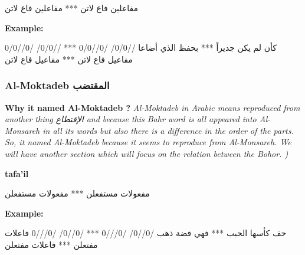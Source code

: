 \begin{Arabic}
  \begin{traditionalpoem*}

مفاعلين فاع لاتن *** مفاعلين فاع لاتن 
    
  \end{traditionalpoem*}
      \end{Arabic}


\textbf{Example:}

\begin{Arabic}
  \begin{traditionalpoem*}


    كأن لم يكن جديراً *** بحفظ الذي أضاعا
    //0/0/  /0//0/0 *** //0/0/  /0//0/0
    مفاعيل  فاع لاتن *** مفاعيل  فاع لاتن
    
          
	\end{traditionalpoem*}
      \end{Arabic}
 \newpage
      

\subsubsection{Al-Moktadeb \textarabic{المقتضب}}
\textbf{Why it named Al-Moktadeb ?}
\textit{Al-Moktadeb in Arabic means reproduced from another thing \textarabic{الإقتطاع} and because this Bahr word is all appeared into Al-Monsareh in all its words but also there is a difference in the order of the parts. So, it named Al-Moktadeb because it seems to reproduce from Al-Monsareh. We will have another section which will focus on the relation between the Bohor. ) %
}

\textbf{tafa'il}

\begin{Arabic}
  \begin{traditionalpoem*}

مفعولات مستفعلن *** مفعولات مستفعلن 
    
  \end{traditionalpoem*}
      \end{Arabic}


\textbf{Example:}

\begin{Arabic}
  \begin{traditionalpoem*}

    حف كأسها الحبب *** فهي فضة ذهب
    /0//0/  /0///0 *** /0//0/  /0///0
    فاعلات  مفتعلن *** فاعلات مفتعلن
    

    
          
	\end{traditionalpoem*}
      \end{Arabic}


